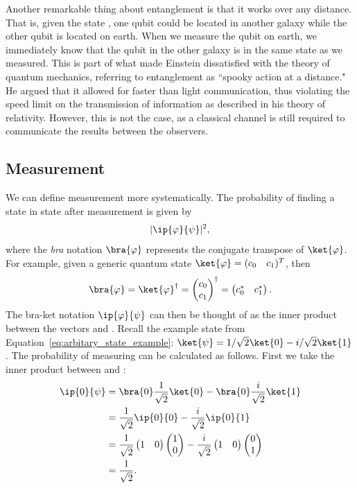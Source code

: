 \documentclass[a4paper,10pt]{article}
\newcommand{\qstatezero}{
	\begin{pmatrix}1 \\ 0\end{pmatrix}
}
\newcommand{\qstateone}{
	\begin{pmatrix}0 \\ 1\end{pmatrix}
}
\begin{document}
Another remarkable thing about entanglement is that it works over any distance.
That is, given the state \ket{\Phi^+}, one qubit could be located in another galaxy while the other qubit is located on earth.
When we measure the qubit on earth, we immediately know that the qubit in the other galaxy is in the same state as we measured.
This is part of what made Einstein dissatisfied with the theory of quantum mechanics, referring to entanglement as ``spooky action at a distance."
He argued that it allowed for faster than light communication, thus violating the speed limit on the transmission of information as described in his theory of relativity.
However, this is not the case, as a classical channel is still required to communicate the results between the observers.

\subsection{Measurement}
We can define measurement more systematically.
The probability of finding a state \ket{\psi} in state \ket{\varphi} after measurement is given by
\begin{equation}
\lvert\ip{\varphi}{\psi}\rvert^2,
\end{equation}
where the \emph{bra} notation $\bra{\varphi}$ represents the conjugate transpose of $\ket{\varphi}$.
For example, given a generic quantum state $\ket{\varphi} = (\begin{matrix}c_0 & c_1\end{matrix})^T$, then 
\begin{equation}
\bra{\varphi} = \ket{\varphi}^\dagger = \begin{pmatrix}c_0 \\ c_1\end{pmatrix}^\dagger =  \begin{pmatrix}c_0^* & c_1^*\end{pmatrix}.
\end{equation}
The bra-ket notation $\ip{\varphi}{\psi}$ can then be thought of as the inner product between the vectors \ket{\varphi} and \ket{\psi}.
Recall the example state from Equation~\ref{eq:arbitary_state_example}: $\ket{\psi} = 1/\sqrt2\ket{0} - i/\sqrt2\ket{1}$.
The probability of measuring  can be calculated as follows.
First we take the inner product between  and \ket{\psi}:
\begin{equation}
\begin{aligned}
\ip{0}{\psi} &= \bra{0}\dfrac{1}{\sqrt2}\ket{0} - \bra{0}\dfrac{i}{\sqrt2}\ket{1} \\
&= \dfrac{1}{\sqrt2}\ip{0}{0} - \dfrac{i}{\sqrt2}\ip{0}{1} \\
&= \dfrac{1}{\sqrt2}\begin{pmatrix}1 & 0\end{pmatrix} \qstatezero - \dfrac{i}{\sqrt2}\begin{pmatrix}1 & 0\end{pmatrix} \qstateone \\
&= \dfrac{1}{\sqrt2}. \\
\end{aligned}
\end{equation}
\end{document}
